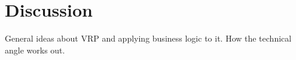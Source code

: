 \chapter{Discussion}
\label{chapter:discussion}

General ideas about VRP and applying business logic to it. How the technical angle works out.